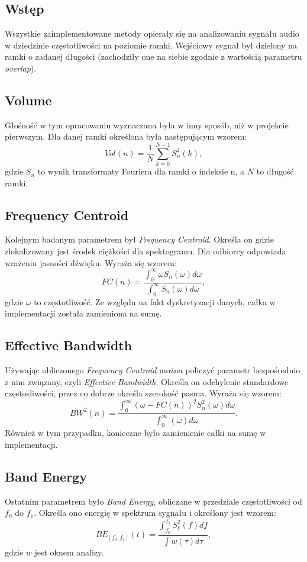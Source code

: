 \documentclass{article}
\begin{document}
\subsection{Wstęp}
Wszystkie zaimplementowane metody opierały się na analizowaniu sygnału audio w dziedzinie częstotliwości na poziomie ramki. Wejściowy sygnał był dzielony na ramki o zadanej długości (zachodziły one na siebie zgodnie z wartością parametru \textit{overlap}).

\subsection{Volume}
Głośność w tym opracowaniu wyznaczana była w inny sposób, niż w projekcie pierwszym. Dla danej ramki określona była następującym wzorem:
$$Vol(n) = \frac{1}{N}\sum^{N-1}_{k=0}S_n^2(k),$$
gdzie $S_n$ to wynik transformaty Fouriera dla ramki o indeksie n, a $N$ to długość ramki.

\subsection{Frequency Centroid}
Kolejnym badanym parametrem był \textit{Frequency Centroid}. Określa on gdzie zlokalizowany jest środek ciężkości dla spektogramu. Dla odbiorcy odpowiada wrażeniu jasności dźwięku. Wyraża się wzorem:
$$FC(n)=\frac{\int_{0}^{\infty} \omega S_n(\omega)d\omega}{\int_0^\infty S_n(\omega)d\omega},$$
gdzie $\omega$ to częstotliwość. Ze względu na fakt dyskretyzacji danych, całka w implementacji została zamieniona na sumę.

\subsection{Effective Bandwidth}
Używając obliczonego \textit{Frequency Centroid} można policzyć parametr bezpośrednio z nim związany, czyli \textit{Effective Bandwidth}. Określa on odchylenie standardowe częstosliwości, przez co dobrze określa szerokość pasma. Wyraża się wzorem:
$$BW^2(n)=\frac{\int_0^\infty(\omega-FC(n))^2S_n^2(\omega)d\omega}{\int_0^\infty(\omega)d\omega}.$$
Również w tym przypadku, konieczne było zamienienie całki na sumę w implementacji.

\subsection{Band Energy}
Ostatnim parametrem było \textit{Band Energy}, obliczane w przedziale częstotliwości od $f_0$ do $f_1$. Określa ono energię w spektrum sygnału i określony jest wzorem:
$$BE_{[f_0,f_1]}(t)=\frac{\int_{f_0}^{f_1}S_t^2(f)df}{\int w(\tau)d\tau},$$
gdzie $w$ jest oknem analizy.
\end{document}
